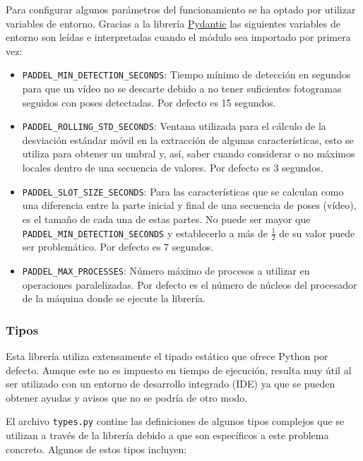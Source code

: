 Para configurar algunos parámetros del funcionamiento se ha optado por utilizar
variables de entorno. Gracias a la librería
\href{https://docs.pydantic.dev/latest/}{Pydantic} las siguientes variables de
entorno son leídas e interpretadas cuando el módulo sea importado por primera
vez:

\begin{itemize}
    \item \texttt{PADDEL\_MIN\_DETECTION\_SECONDS}: Tiempo mínimo de detección en
    segundos para que un vídeo no se descarte debido a no tener suficientes
    fotogramas seguidos con poses detectadas. Por defecto es 15 segundos.
    \item \texttt{PADDEL\_ROLLING\_STD\_SECONDS}: Ventana utilizada para el cálculo
    de la desviación estándar móvil en la extracción de algunas características,
    esto se utiliza para obtener un umbral y, así, saber cuando considerar o no
    máximos locales dentro de una secuencia de valores. Por defecto es 3
    segundos.
    \item \texttt{PADDEL\_SLOT\_SIZE\_SECONDS}: Para las características que se
    calculan como una diferencia entre la parte inicial y final de una secuencia
    de poses (vídeo), es el tamaño de cada una de estas partes. No puede ser
    mayor que \texttt{PADDEL\_MIN\_DETECTION\_SECONDS} y establecerlo a más de
    $\frac{1}{2}$ de su valor puede ser problemático. Por defecto es 7 segundos.
    \item \texttt{PADDEL\_MAX\_PROCESSES}: Número máximo de procesos a utilizar en
    operaciones paralelizadas. Por defecto es el número de núcleos del
    procesador de la máquina donde se ejecute la librería.
\end{itemize}

\subsubsection{Tipos}

Esta librería utiliza extensamente el tipado estático que ofrece Python por
defecto. Aunque este no es impuesto en tiempo de ejecución, resulta muy útil al
ser utilizado con un entorno de desarrollo integrado (IDE) ya que se pueden
obtener ayudas y avisos que no se podría de otro modo.

El archivo \texttt{types.py} contine las definiciones de algunos tipos complejos
que se utilizan a través de la librería debido a que son específicos a este
problema concreto. Algunos de estos tipos incluyen:

